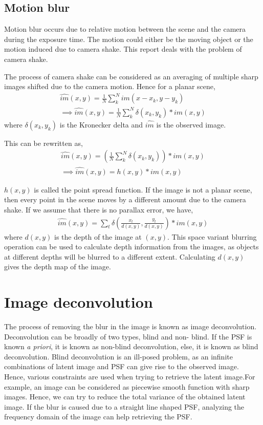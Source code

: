 \documentclass[BTech]{iitmdiss}
\begin{document}
\subsection{Motion blur}
\label{basic_theory:image_blur:motion}
Motion blur occurs due to relative motion between the scene and the 
camera during the exposure time. The motion could either be the moving 
object or the motion induced due to camera shake. This report deals with
the problem of camera shake.

The process of camera shake can be considered as an averaging of 
multiple sharp images shifted due to the camera motion. Hence for a 
planar scene, 
\begin{align}
\hat{im}(x,y) = \frac{1}{N}\sum_k^Nim(x-x_k,y-y_k)\\
\implies\hat{im}(x,y) = \frac{1}{N}\sum_k^N\delta(x_k, y_k)*im(x,y)
\end{align}
where $\delta(x_k, y_k)$ is the Kronecker delta and $\hat{im}$ is
the observed image.

This can be rewritten as,
\begin{align}
\hat{im}(x,y) = (\frac{1}{N}\sum_k^N\delta(x_k, y_k))*im(x,y)\\
\implies \hat{im}(x,y) = h(x,y)*im(x,y)
\end{align}

$h(x,y)$ is called the point spread function. If the image is not a 
planar scene, then every point in the scene moves by a different amount
due to the camera shake. If we assume that there is no parallax error,
we have,
\begin{align}
\hat{im}(x,y) = \sum_t\delta(\frac{x_t}{d(x,y)}, \frac{y_t}{d(x,y)})*im(x,y)
\end{align}
where $d(x,y)$ is the depth of the image at $(x,y)$. This space variant
blurring operation can be used to calculate depth information from the 
images, as objects at different depths will be blurred to a different
extent. Calculating $d(x,y)$ gives the depth map of the image.

\section{Image deconvolution}
\label{basic_theory:deconv}
The process of removing the blur in the image is known as image
deconvolution. Deconvolution can be broadly of two types, blind and non-
blind. If the PSF is known \emph{a priori}, it is known as non-blind 
deconvolution, else, it is known as blind deconvolution. 
Blind deconvolution is an ill-posed problem, as an infinite combinations of 
latent image and PSF can give rise to the observed image. Hence, various
constraints are used when trying to retrieve the latent image\citet{fergus2006removing, krishnan2009fast, levin2007deconvolution,gupta2010single}.For example, an image can be considered as piecewise smooth function with
sharp images. Hence, we can try to reduce the total variance of the 
obtained latent image\citet{money2006total,chan1998total}. If the blur
is caused due to a straight line shaped PSF, analyzing the frequency
domain of the image can help retrieving the PSF\cite{oliveira2007blind}.
\end{document}
